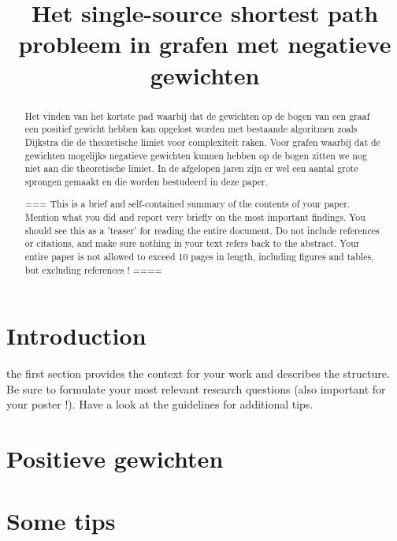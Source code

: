 \documentclass[conference]{IEEEtran}
\begin{document}
\title{Het single-source shortest path probleem in grafen met negatieve gewichten}

\author{
}

\maketitle

\begin{abstract}
Het vinden van het kortste pad waarbij dat de gewichten op de bogen van een graaf een positief gewicht hebben kan opgelost worden met bestaande algoritmen zoals Dijkstra die de theoretische limiet voor complexiteit raken. Voor grafen waarbij dat de gewichten mogelijks negatieve gewichten kunnen hebben op de bogen zitten we nog niet aan die theoretische limiet. In de afgelopen jaren zijn er wel een aantal grote sprongen gemaakt en die worden bestudeerd in deze paper.

===
This is a brief and self-contained summary of the contents of your paper. Mention what you did and report very briefly on the most important findings. You should see this as a 'teaser' for reading the entire document. Do not include references or citations, and make sure nothing in your text refers back to the abstract. Your entire paper is not allowed to exceed 10 pages in length, including figures and tables, but excluding references !
====
\end{abstract}

\section{Introduction}
the first section provides the context for your work and describes the structure. Be sure to formulate your most relevant research questions (also important for your poster !). Have a look at the guidelines for additional tips.

\section{Positieve gewichten}


\section{Some tips}
\end{document}
